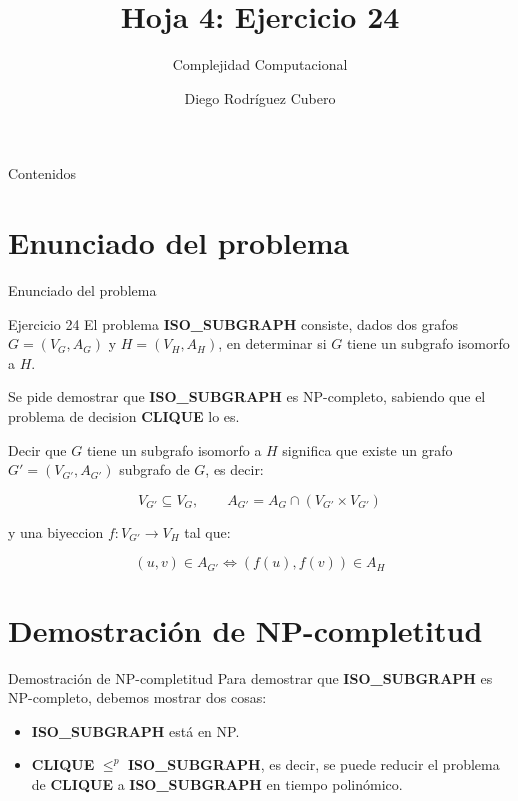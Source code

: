 \documentclass[aspectratio=169]{beamer}
\title{Hoja 4: Ejercicio 24}
\subtitle{Complejidad Computacional}
\author{Diego Rodríguez Cubero}
\institute{UCM}
\begin{document}
\begin{frame}
    \titlepage
\end{frame}

\begin{frame}{Contenidos}
    \tableofcontents
\end{frame}

\section{Enunciado del problema}
\begin{frame}{Enunciado del problema}
    \begin{block}{Ejercicio 24}
        El problema \textbf{ISO\_SUBGRAPH} consiste, dados dos grafos
        $G = (V_G, A_G)$ y $H = (V_H, A_H)$, en determinar si $G$ tiene un
        subgrafo isomorfo a $H$.

        Se pide demostrar que \textbf{ISO\_SUBGRAPH} es NP-completo, sabiendo
        que el problema de decision \textbf{CLIQUE} lo es.

        Decir que $G$ tiene un subgrafo isomorfo a $H$ significa que existe un
        grafo $G' = (V_{G'}, A_{G'})$ subgrafo de $G$, es decir:

        \[
        V_{G'} \subseteq V_G, \qquad
        A_{G'} = A_G \cap (V_{G'} \times V_{G'})
        \]

        y una biyeccion $f : V_{G'} \to V_H$ tal que:

        \[
        (u, v) \in A_{G'} \Longleftrightarrow (f(u), f(v)) \in A_H
        \]
    \end{block}
\end{frame}

\section{Demostración de NP-completitud}
\begin{frame}{Demostración de NP-completitud}
    Para demostrar que \textbf{ISO\_SUBGRAPH} es NP-completo, debemos
    mostrar dos cosas:

    \begin{itemize}
        \item \textbf{ISO\_SUBGRAPH} está en NP.
        \item \textbf{CLIQUE} $\leq^p$ \textbf{ISO\_SUBGRAPH}, es decir, se puede reducir el problema de \textbf{CLIQUE} a \textbf{ISO\_SUBGRAPH} en tiempo polinómico.
    \end{itemize}
\end{frame}
\end{document}

